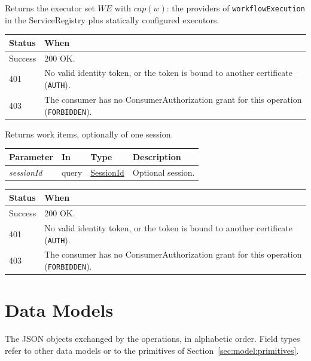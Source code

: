 \documentclass[a4paper]{arrowhead}
\newcommand{\fparam}[1]{\textit{\textcolor{ArrowheadBlue}{#1}}}
\newcommand{\pref}[1]{{\textcolor{ArrowheadGrey}{\hyperref[sec:model:primitives:#1]{#1}}}}
\begin{document}
Returns the executor set $WE$ with $cap(w)$: the providers of \texttt{workflowExecution} in the ServiceRegistry plus statically configured executors.

{\small
\begin{longtable}{|p{2.0cm}|p{13.8cm}|}

\hline
\rowcolor{gray!33} Status & When \\ \hline
\endhead
Success & 200 OK. \\ \hline
401 & No valid identity token, or the token is bound to another certificate (\texttt{AUTH}). \\ \hline
403 & The consumer has no ConsumerAuthorization grant for this operation (\texttt{FORBIDDEN}). \\ \hline
\end{longtable}
}

Returns work items, optionally of one session.

{\small
\begin{longtable}{|p{3.0cm}|p{1.4cm}|p{3.2cm}|p{8.2cm}|}

\hline
\rowcolor{gray!33} Parameter & In & Type & Description \\ \hline
\endhead
\fparam{sessionId} & query & \pref{SessionId} & Optional session. \\ \hline
\end{longtable}
}


{\small
\begin{longtable}{|p{2.0cm}|p{13.8cm}|}

\hline
\rowcolor{gray!33} Status & When \\ \hline
\endhead
Success & 200 OK. \\ \hline
401 & No valid identity token, or the token is bound to another certificate (\texttt{AUTH}). \\ \hline
403 & The consumer has no ConsumerAuthorization grant for this operation (\texttt{FORBIDDEN}). \\ \hline
\end{longtable}
}


\newpage
\section{Data Models}
\label{sec:model}
The JSON objects exchanged by the operations, in alphabetic order. Field types refer to other data models or to the
primitives of Section~\ref{sec:model:primitives}.
\end{document}
